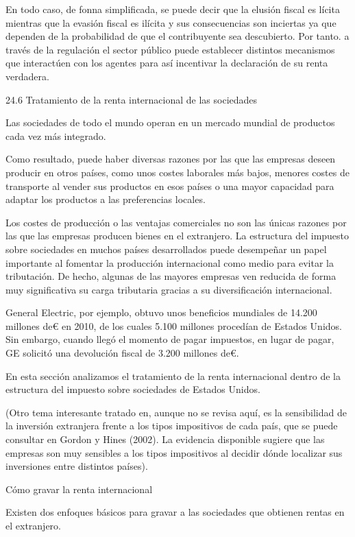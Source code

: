\documentclass[10pt,a4paper]{article}
\begin{document}
En todo caso, de fonna simplificada, se puede decir que la elusión fiscal es lícita mientras que la evasión fiscal es ilícita y sus consecuencias son inciertas ya que dependen de la probabilidad de que el contribuyente sea descubierto. Por tanto. a través de la regulación el sector público puede establecer distintos mecanismos que interactúen con los agentes para así incentivar la declaración de su renta verdadera.

24.6 Tratamiento de la renta internacional de las sociedades

Las sociedades de todo el mundo operan en un mercado mundial de productos cada vez más integrado.

Como resultado, puede haber diversas razones por las que las empresas deseen producir en otros países, como unos costes laborales más bajos, menores costes de transporte al vender sus productos en esos países o una mayor capacidad para adaptar los productos a las preferencias locales.

Los costes de producción o las ventajas comerciales no son las únicas razones por las que las empresas producen bienes en el extranjero. La estructura del impuesto sobre sociedades en muchos países desarrollados puede desempeñar un papel importante al fomentar la producción internacional como medio para evitar la tributación. De hecho, algunas de las mayores empresas ven reducida de forma muy significativa su carga tributaria gracias a su diversificación internacional.

General Electric, por ejemplo, obtuvo unos beneficios mundiales de 14.200 millones de€ en 2010, de los cuales 5.100 millones procedían de Estados Unidos. Sin embargo, cuando llegó el momento de pagar impuestos, en lugar de pagar, GE solicitó una devolución fiscal de 3.200 millones de€.

En esta sección analizamos el tratamiento de la renta internacional dentro de la estructura del impuesto sobre sociedades de Estados Unidos.

(Otro tema interesante tratado en, aunque no se revisa aquí, es la sensibilidad de la inversión extranjera frente a los tipos impositivos de cada país, que se puede consultar en Gordon y Hines (2002). La evidencia disponible sugiere que las empresas son muy sensibles a los tipos impositivos al decidir dónde localizar sus inversiones entre distintos países).

Cómo gravar la renta internacional

Existen dos enfoques básicos para gravar a las sociedades que obtienen rentas en el extranjero.
\end{document}
